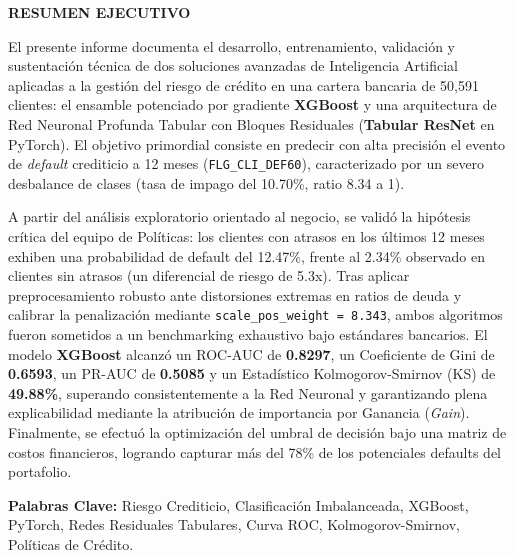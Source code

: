 \documentclass[11pt,a4paper]{article}
\begin{document}
\begin{resumenbox}
\begin{center}
    {\large\bfseries\color{ContinentalBlue} RESUMEN EJECUTIVO}
\end{center}
\vspace{0.2cm}
El presente informe documenta el desarrollo, entrenamiento, validación y sustentación técnica de dos soluciones avanzadas de Inteligencia Artificial aplicadas a la gestión del riesgo de crédito en una cartera bancaria de 50,591 clientes: el ensamble potenciado por gradiente \textbf{XGBoost} y una arquitectura de Red Neuronal Profunda Tabular con Bloques Residuales (\textbf{Tabular ResNet} en PyTorch). El objetivo primordial consiste en predecir con alta precisión el evento de \textit{default} crediticio a 12 meses (\texttt{FLG\_CLI\_DEF60}), caracterizado por un severo desbalance de clases (tasa de impago del 10.70\%, ratio 8.34 a 1). 

A partir del análisis exploratorio orientado al negocio, se validó la hipótesis crítica del equipo de Políticas: los clientes con atrasos en los últimos 12 meses exhiben una probabilidad de default del 12.47\%, frente al 2.34\% observado en clientes sin atrasos (un diferencial de riesgo de 5.3x). Tras aplicar preprocesamiento robusto ante distorsiones extremas en ratios de deuda y calibrar la penalización mediante \texttt{scale\_pos\_weight = 8.343}, ambos algoritmos fueron sometidos a un benchmarking exhaustivo bajo estándares bancarios. El modelo \textbf{XGBoost} alcanzó un ROC-AUC de \textbf{0.8297}, un Coeficiente de Gini de \textbf{0.6593}, un PR-AUC de \textbf{0.5085} y un Estadístico Kolmogorov-Smirnov (KS) de \textbf{49.88\%}, superando consistentemente a la Red Neuronal y garantizando plena explicabilidad mediante la atribución de importancia por Ganancia (\textit{Gain}). Finalmente, se efectuó la optimización del umbral de decisión bajo una matriz de costos financieros, logrando capturar más del 78\% de los potenciales defaults del portafolio.

\vspace{0.3cm}
\textbf{Palabras Clave:} Riesgo Crediticio, Clasificación Imbalanceada, XGBoost, PyTorch, Redes Residuales Tabulares, Curva ROC, Kolmogorov-Smirnov, Políticas de Crédito.
\end{resumenbox}

\vspace{0.5cm}

\tableofcontents
\newpage
\listoffigures
\vspace{0.5cm}
\listoftables
\newpage
{}
\end{document}
